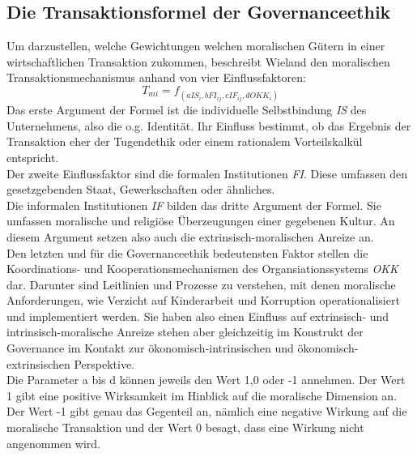 \documentclass[12pt]{article}
\begin{document}
\subsection{Die Transaktionsformel der Governanceethik}
Um darzustellen, welche Gewichtungen welchen moralischen Gütern in einer wirtschaftlichen Transaktion zukommen, beschreibt Wieland den moralischen Transaktionsmechanismus anhand von vier Einflussfaktoren:
\[T_{mi}=f_{(aIS_i, bFI_{ij}, cIF_{ij}, dOKK_i)}\]
Das erste Argument der Formel ist die individuelle Selbstbindung \textit{IS} des Unternehmens, also die o.g. Identität. Ihr Einfluss bestimmt, ob das Ergebnis der Transaktion eher der Tugendethik oder einem rationalem Vorteilskalkül entspricht.\\
Der zweite Einflussfaktor sind die formalen Institutionen \textit{FI}. Diese umfassen den gesetzgebenden Staat, Gewerkschaften oder ähnliches.\\
Die informalen Institutionen \textit{IF} bilden das dritte Argument der Formel. Sie umfassen moralische und religiöse Überzeugungen einer gegebenen Kultur. An diesem Argument setzen also auch die extrinsisch-moralischen Anreize an.\\
Den letzten und für die Governanceethik bedeutensten Faktor stellen die Koordinations- und Kooperationsmechanismen des Organsiationssystems \textit{OKK} dar. Darunter sind Leitlinien und Prozesse zu verstehen, mit denen moralische Anforderungen, wie Verzicht auf Kinderarbeit und Korruption operationalisiert und implementiert werden. Sie haben also einen Einfluss auf extrinsisch- und intrinsisch-moralische Anreize stehen aber gleichzeitig im Konstrukt der Governance im Kontakt zur ökonomisch-intrinsischen und ökonomisch-extrinsischen Perspektive.\\
Die Parameter a bis d können jeweils den Wert 1,0 oder -1 annehmen. Der Wert 1 gibt eine positive Wirksamkeit im Hinblick auf die moralische Dimension an. Der Wert -1 gibt genau das Gegenteil an, nämlich eine negative Wirkung auf die moralische Transaktion und der Wert 0 besagt, dass eine Wirkung nicht angenommen wird.
\end{document}
